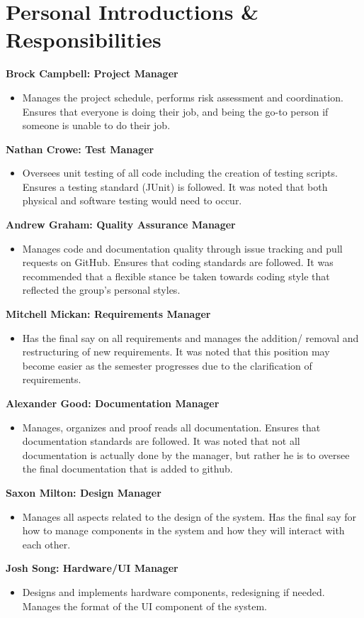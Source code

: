 \documentclass{article}
\begin{document}
\section{Personal Introductions \& Responsibilities}
	\textbf{Brock Campbell: Project Manager }
	\begin{itemize}
	\item Manages the project schedule, performs risk assessment and coordination. Ensures that everyone is doing their job, and being the go-to person if someone is unable to do their job. 
	\end{itemize}
	\textbf{Nathan Crowe: Test Manager}
	\begin{itemize}
    \item Oversees unit testing of all code including the creation of testing scripts. Ensures a testing standard (JUnit) is followed. It was noted that both physical and software testing would need to occur.
	\end{itemize}
	\textbf{Andrew Graham: Quality Assurance Manager}
	\begin{itemize}
    \item Manages code and documentation quality through issue tracking and pull requests on GitHub. Ensures that coding standards are followed. It was recommended that a flexible stance be taken towards coding style that reflected the group's personal styles.
	\end{itemize}
	\textbf{Mitchell Mickan: Requirements Manager}
	\begin{itemize}
	\item Has the final say on all requirements and manages the addition/ removal and restructuring of new requirements. It was noted that this position may become easier as the semester progresses due to the clarification of requirements.
	\end{itemize}
    \textbf{Alexander Good: Documentation Manager}
    \begin{itemize}
    \item Manages, organizes and proof reads all documentation. Ensures that documentation standards are followed. It was noted that not all documentation is actually done by the manager, but rather he is to oversee the final documentation that is added to github.
    \end{itemize}
    \textbf{Saxon Milton: Design Manager}
    \begin{itemize}
    \item Manages all aspects related to the design of the system. Has the final say for how to manage components in the system and how they will interact with each other.
    \end{itemize}
    \textbf{Josh Song: Hardware/UI Manager}
    \begin{itemize}
    \item Designs and implements hardware components, redesigning if needed. Manages the format of the UI component of the system.
    \end{itemize}
\end{document}
